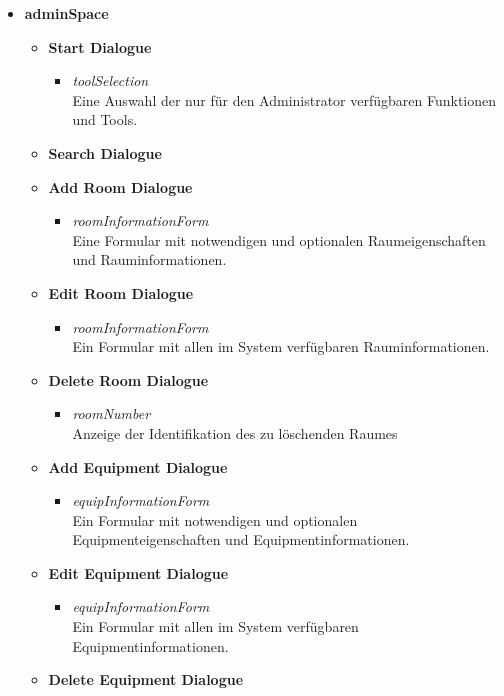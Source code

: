 \begin{itemize}[noitemsep]
	\item \textbf{adminSpace}
	\begin{itemize}
		\item \textbf{Start Dialogue}
		\begin{itemize}
			\item \textit{toolSelection}\\Eine Auswahl der nur für den Administrator verfügbaren Funktionen und Tools.
		\end{itemize}
		\item \textbf{Search Dialogue}
		\item \textbf{Add Room Dialogue}
		\begin{itemize}
			\item \textit{roomInformationForm}\\Eine Formular mit notwendigen und optionalen Raumeigenschaften und Rauminformationen.
		\end{itemize}
		\item \textbf{Edit Room Dialogue}
		\begin{itemize}
			\item \textit{roomInformationForm}\\Ein Formular mit allen im System verfügbaren Rauminformationen.
		\end{itemize}
		\item \textbf{Delete Room Dialogue}
		\begin{itemize}
			\item \textit{roomNumber}\\Anzeige der Identifikation des zu löschenden Raumes
		\end{itemize}
		\item \textbf{Add Equipment Dialogue}
		\begin{itemize}
			\item \textit{equipInformationForm}\\Ein Formular mit notwendigen und optionalen Equipmenteigenschaften und Equipmentinformationen.
		\end{itemize}
		\item \textbf{Edit Equipment Dialogue}
		\begin{itemize}
			\item \textit{equipInformationForm}\\Ein Formular mit allen im System verfügbaren Equipmentinformationen.
		\end{itemize}
		\item \textbf{Delete Equipment Dialogue}
		\begin{itemize}

\end{itemize}
\end{itemize}
\end{itemize}
